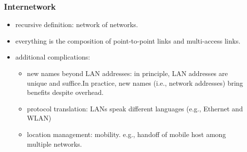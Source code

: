 \documentclass{../../ainote}
\begin{document}
\subsubsection{Internetwork}
\begin{itemize}[leftmargin=*]
    \item recursive definition: network of networks.
    \item everything is the composition of point-to-point links and multi-access links.
    \item additional complications:
        \begin{itemize}
            \item new names beyond LAN addresses: in principle, LAN addresses are unique and suffice.In practice, new names (i.e., network addresses) bring benefits despite overhead. 
            \item protocol translation: LANs speak different languages (e.g., Ethernet and
            WLAN)
            \item location management: mobility. e.g., handoff of mobile host among multiple networks.
        \end{itemize}
\end{itemize}
\end{document}
